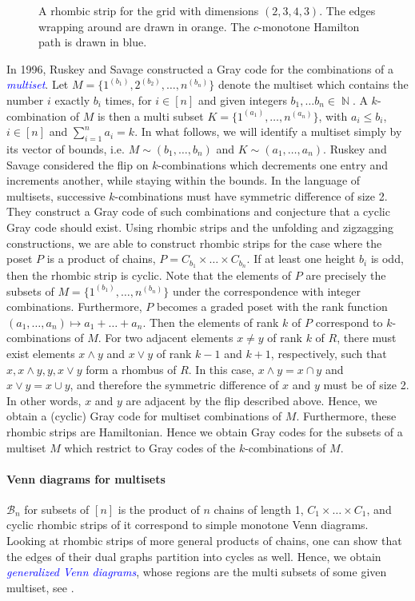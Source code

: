 \documentclass[fontsize=11pt,a4paper,DIV=12]{scrartcl}
\newcommand{\defn}[1]{\textsl{\textcolor{Blue}{#1}}}
\DeclareMathOperator{\N}{\mathbb{N}}
\begin{document}
\begin{figure}[ht]
	\centering
	\makebox[\textwidth][c]{}
	\caption{A rhombic strip for the grid with dimensions $(2,3,4,3)$. The edges wrapping around are drawn in orange. The $c$-monotone Hamilton path is drawn in blue.}
	\label{fig:multiset small}
\end{figure}
In 1996, Ruskey and Savage \cite{Combinations_multi_set} constructed a Gray code for the combinations of a \defn{multiset}. Let $M=\{1^{(b_1)},2^{(b_2)},\ldots,n^{(b_n)}\}$ denote the multiset which contains the number $i$ exactly $b_i$ times, for $i\in[n]$ and given integers $b_1,\ldots b_n\in\N$. A $k$-combination of $M$ is then a multi subset $K=\{1^{(a_1)},\ldots,n^{(a_n)}\}$, with $a_i\le b_i$, $i\in[n]$ and $\sum_{i=1}^na_i=k$. In what follows, we will identify a multiset simply by its vector of bounds, i.e. $M\sim (b_1,\ldots,b_n)$ and $K\sim (a_1,\ldots, a_n)$. Ruskey and Savage considered the flip on $k$-combinations which decrements one entry and increments another, while staying within the bounds. In the language of multisets, successive $k$-combinations must have symmetric difference of size 2.
They construct a Gray code of such combinations and conjecture that a cyclic Gray code should exist. Using rhombic strips and the unfolding and zigzagging constructions, we are able to construct rhombic strips for the case where the poset $P$ is a product of chains, $P=C_{b_1}\times\ldots\times C_{b_n}$. If at least one height $b_i$ is odd, then the rhombic strip is cyclic. Note that the elements of $P$ are precisely the subsets of $M=\{1^{(b_1)},\ldots,n^{(b_n)}\}$ under the correspondence with integer combinations. Furthermore, $P$ becomes a graded poset with the rank function $(a_1,\ldots,a_n)\mapsto a_1+\ldots+a_n$. Then the elements of rank $k$ of $P$ correspond to $k$-combinations of $M$. For two adjacent elements $x\ne y$ of rank $k$ of $R$, there must exist elements $x\land y$ and $x\lor y$ of rank $k-1$ and $k+1$, respectively, such that $x,x\land y,y,x\lor y$ form a rhombus of $R$. In this case, $x\land y=x\cap y$ and $x\lor y= x\cup y$, and therefore the symmetric difference of $x$ and $y$ must be of size 2. In other words, $x$ and $y$ are adjacent by the flip described above. Hence, we obtain a (cyclic) Gray code for multiset combinations of $M$. Furthermore, these rhombic strips are Hamiltonian. Hence we obtain Gray codes for the subsets of a multiset $M$ which restrict to Gray codes of the $k$-combinations of $M$.

\paragraph{Venn diagrams for multisets}
$\mathcal B_n$ for subsets of $[n]$ is the product of $n$ chains of length 1, $C_1\times\ldots\times C_1$, and cyclic rhombic strips of it correspond to simple monotone Venn diagrams. Looking at rhombic strips of more general products of chains, one can show that the edges of their dual graphs partition into cycles as well. Hence, we obtain \defn{generalized Venn diagrams}, whose regions are the multi subsets of some given multiset, see .
\end{document}
